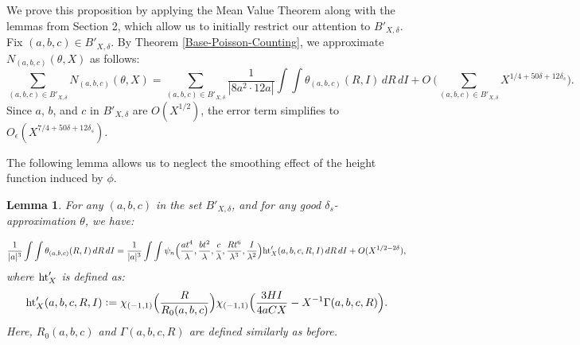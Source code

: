 \documentclass{article}
\def \h{{\rm ht}}
\newtheorem{lemma}[theorem]{Lemma}
\begin{document}
We prove this proposition by applying the Mean Value Theorem along with the lemmas from Section 2, which allow us to initially restrict our attention to $B'_{X,\delta}$. Fix $(a,b,c) \in B'_{X,\delta}$. By Theorem \ref{Base-Poisson-Counting}, we approximate $N_{(a,b,c)}(\theta, X)$ as follows:
\begin{equation*}   
\sum_{(a,b,c)\in B'_{X,\delta}} N_{(a,b,c)}(\theta,X) = \sum_{(a,b,c)\in B'_{X,\delta}} \frac{1}{|8a^2 \cdot 12a|}\int \int \theta_{(a,b,c)}(R,I) \, dR \, dI + O\
\Big(\sum_{(a,b,c)\in B'_{X,\delta}} X^{1/4+50\delta+12\delta_s} \Big). \end{equation*} 
Since $a$, $b$, and $c$ in $B'_{X,\delta}$ are $O(X^{1/2})$, the error term simplifies to $O_{\epsilon}(X^{7/4 + 50\delta + 12\delta_s})$.

The following lemma allows us to neglect the smoothing effect of the height function induced by $\phi$.
 
\begin{lemma}\label{ignore-h}
For any $(a, b, c)$ in the set $B'_{X, \delta}$, and for any good $\delta_s$-approximation $\theta$, we have:

    \begin{equation*}
        \frac{1}{|a|^3} \int \int \theta_{(a, b, c)}(R, I) \, dR \, dI 
        =\frac{1}{|a|^3} \int \int 
        \psi_{n} \Big( 
            \frac{at^4}{\lambda}, 
            \frac{bt^2}{\lambda}, 
            \frac{c}{\lambda}, 
            \frac{Rt^6}{\lambda^3}, 
            \frac{I}{\lambda^2} 
        \Big) 
        \h_X'(a, b, c, R, I) \, dR \, dI 
       +O(X^{1/2 - 2\delta}),
    \end{equation*}
 where $\h_X'$ is defined as:
   \begin{equation}
       \h_X'(a,b,c,R,I) \vcentcolon=  \chi_{(-1,1)}\Big(\frac{R}{R_0(a,b,c)}\Big) \chi_{(-1,1)}\Big(\frac{3HI}{4aCX}-X^{-1}\Gamma(a,b,c,R)\Big).
   \end{equation} 
Here, $R_0(a,b,c)$ and $\Gamma(a,b,c,R)$ are defined similarly as before.  
\end{lemma}
\end{document}
